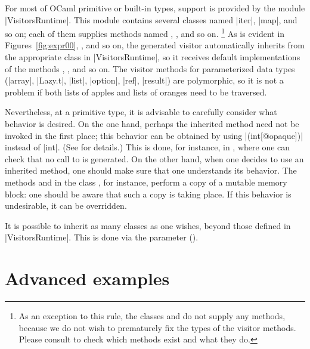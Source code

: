 \documentclass[11pt,a4paper,twoside]{article}
\begin{document}
For most of OCaml primitive or built-in types, support is provided by the
module \oc|VisitorsRuntime|. This module contains several classes named
\oc|iter|, \oc|map|, and so on; each of them supplies methods named
, , and so on.%
%
\footnote{As an exception to this rule, the classes 
  and  do not supply any methods, because we do not
  wish to prematurely fix the types of the visitor methods. Please consult
   to check which methods exist and what they
  do.} %
%
As is evident in Figures~\ref{fig:expr00}, , and so on, the
generated visitor automatically inherits from the appropriate class in
\oc|VisitorsRuntime|, so it receives default implementations of the methods
, , and so on. The visitor methods for
parameterized data types (\oc|array|, \oc|Lazy.t|, \oc|list|, \oc|option|,
\oc|ref|, \oc|result|) are polymorphic, so it is not a problem if both lists
of apples and lists of oranges need to be traversed.

Nevertheless, at a primitive type, it is advisable to carefully consider what
behavior is desired. On the one hand, perhaps the inherited method
 need not be invoked in the first place; this behavior can
be obtained by using \oc|(int[@opaque])| instead of \oc|int|. (See
 for details.) This is done, for instance, in
, where one can check that no call to  is
generated. On the other hand, when one decides to use an inherited method, one
should make sure that one understands its behavior. The methods
 and  in the class
, for instance, perform a copy of a mutable memory
block: one should be aware that such a copy is taking place. If this behavior
is undesirable, it can be overridden.

It is possible to inherit as many classes as one wishes, beyond those defined
in \oc|VisitorsRuntime|. This is done via the \ancestors parameter
().


\section{Advanced examples}
\label{sec:advanced}
\end{document}
